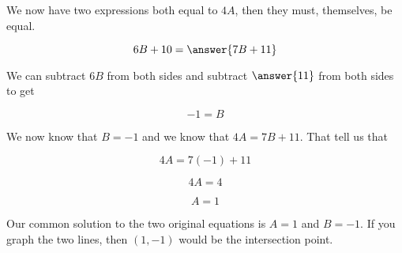 \documentclass{ximera}
\begin{document}
\begin{example}
\begin{explanation}
We now have two expressions both equal to $4A$, then they must, themselves, be equal.


\[   6B + 10 =  \answer{7B + 11}   \]

We can subtract $6B$ from both sides and subtract $\answer{11}$ from both sides to get


\[   -1 =  B   \]



We now know that $B = -1$ and we know that $4A = 7B + 11$.  That tell us that 


\[   4A = 7(-1) + 11   \]

\[   4A = 4   \]


\[ A = 1 \]


Our common solution to the two original equations is $A = 1$ and $B = -1$.  If you graph the two lines, then $(1, -1)$ would be the intersection point.

\end{explanation}
\end{example}
\end{document}
